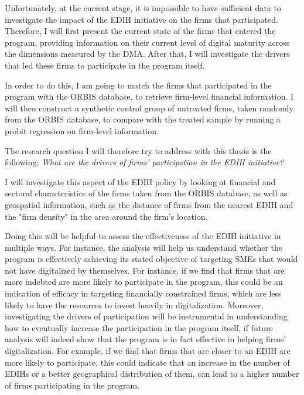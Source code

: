 \documentclass[12pt]{report}
\begin{document}
\par Unfortunately, at the current stage, it is impossible to have sufficient data to investigate the impact of the EDIH initiative on the firms that participated. Therefore, I will first present the current state of the firms that entered the program, providing information on their current level of digital maturity across the dimensions measured by the DMA. After that, I will investigate the drivers that led these firms to participate in the program itself. 
\par In order to do this, I am going to match the firms that participated in the program with the ORBIS database, to retrieve firm-level financial information. I will then construct a synthetic control group of untreated firms, taken randomly from the ORBIS database, to compare with the treated sample by running a probit regression on firm-level information.
\par The research question I will therefore try to address with this thesis is the following: \textit{What are the drivers of firms' participation in the EDIH initiative?}
\par I will investigate this aspect of the EDIH policy by looking at financial and sectoral characteristics of the firms taken from the ORBIS database, as well as geospatial information, such as the distance of firms from the nearest EDIH and the "firm density" in the area around the firm's location.
\par Doing this will be helpful to assess the effectiveness of the EDIH initiative in multiple ways. For instance, the analysis will help us understand whether the program is effectively achieving its stated objective of targeting SMEs that would not have digitalized by themselves. For instance, if we find that firms that are more indebted are more likely to participate in the program, this could be an indication of efficacy in targeting financially constrained firms, which are less likely to have the resources to invest heavily in digitalization. Moreover, investigating the drivers of participation will be instrumental in understanding how to eventually increase the participation in the program itself, if future analysis will indeed show that the program is in fact effective in helping firms' digitalization. For example, if we find that firms that are closer to an EDIH are more likely to participate, this could indicate that an increase in the number of EDIHs or a better geographical distribution of them, can lead to a higher number of firms participating in the program.
\end{document}
